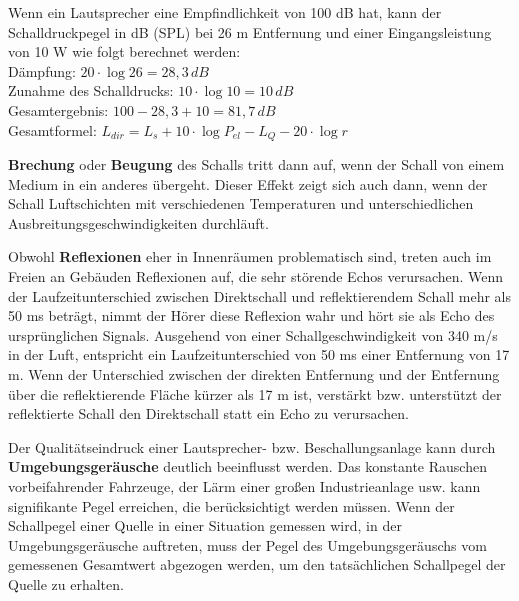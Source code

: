 Wenn ein Lautsprecher eine Empfindlichkeit von 100 dB hat, kann der Schalldruckpegel in dB (SPL) bei 26 m Entfernung und einer Eingangsleistung von 10 W wie folgt berechnet werden:\\[1ex]
Dämpfung: $20\cdot\log26 = 28,3\,dB$ \\
Zunahme des Schalldrucks: $10\cdot\log10 = 10\,dB$ \\
Gesamtergebnis: $100 - 28,3 + 10 = 81,7\,dB$ \\
Gesamtformel: $L_{dir} = L_s + 10\cdot\log P_{el} - L_Q - 20\cdot\log r$

\textbf{Brechung} oder \textbf{Beugung} des Schalls tritt dann auf, wenn der Schall von einem Medium in ein anderes übergeht. Dieser Effekt zeigt sich auch dann, wenn der Schall Luftschichten mit verschiedenen Temperaturen und unterschiedlichen Ausbreitungsgeschwindigkeiten durchläuft.

Obwohl \textbf{Reflexionen} eher in Innenräumen problematisch sind, treten auch im Freien an Gebäuden Reflexionen auf, die sehr störende Echos verursachen. Wenn der Laufzeitunterschied zwischen Direktschall und reflektierendem Schall mehr als 50 ms beträgt, nimmt der Hörer diese Reflexion wahr und hört sie als Echo des ursprünglichen Signals. Ausgehend von einer Schallgeschwindigkeit von 340 m/s in der Luft, entspricht ein Laufzeitunterschied von 50 ms einer Entfernung von 17 m. Wenn der Unterschied zwischen der direkten Entfernung und der Entfernung über die reflektierende Fläche kürzer als 17 m ist, verstärkt bzw. unterstützt der reflektierte Schall den Direktschall statt ein Echo zu verursachen.

Der Qualitätseindruck einer Lautsprecher- bzw. Beschallungsanlage kann durch \textbf{Umgebungsgeräusche} deutlich beeinflusst werden. Das konstante Rauschen vorbeifahrender Fahrzeuge, der Lärm einer großen Industrieanlage usw. kann signifikante Pegel erreichen, die berücksichtigt werden müssen. Wenn der Schallpegel einer Quelle in einer Situation gemessen wird, in der Umgebungsgeräusche auftreten, muss der Pegel des Umgebungsgeräuschs vom gemessenen Gesamtwert abgezogen werden, um den tatsächlichen Schallpegel der Quelle zu erhalten.

